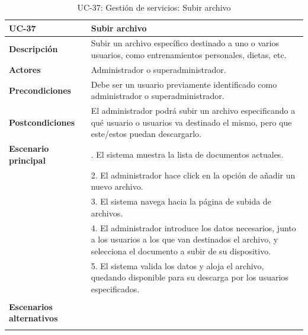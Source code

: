 \begin{table}[H]
  \begin{center}
    \begin{tabularx}{16.4cm}{|l|X|}
      \hline
      \textbf{UC-37} & \textbf{Subir archivo}\\
      \hline
      \textbf{Descripción} & Subir un archivo específico destinado a uno o varios usuarios, como entrenamientos personales, dietas, etc. \\
      \hline
      \textbf{Actores} & Administrador o superadministrador.\\
      \hline
      \textbf{Precondiciones} & Debe ser un usuario previamente identificado como administrador o superadministrador.\\
      \hline
      \textbf{Postcondiciones} & El administrador podrá subir un archivo especificando a qué usuario o usuarios va destinado el mismo, pero que este/estos puedan descargarlo.\\
      \hline
      \textbf{Escenario principal} & \smallskip 1. El sistema muestra la lista de documentos actuales.\\
      & 2. El administrador hace click en la opción de añadir un nuevo archivo.\\
      & 3. El sistema navega hacia la página de subida de archivos.\\
      & 4. El administrador introduce los datos necesarios, junto a los usuarios a los que van destinados el archivo, y selecciona el documento a subir de su dispositivo.\\
      & 5. El sistema valida los datos y aloja el archivo, quedando disponible para su descarga por los usuarios especificados.\\
      & \\
      \hline
      \textbf{Escenarios alternativos} & \\
      & \\
      \hline
    \end{tabularx}
    \caption{UC-37: Gestión de servicios: Subir archivo}
    \label{tab:CU-subir-archivo}
  \end{center}
\end{table}


